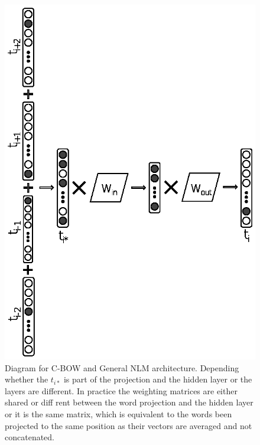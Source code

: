 \begin{figure}[t]
	\begin{center}
    	\includegraphics[scale=0.99]{Figures/CBOW_diagram.eps}
		\caption{Diagram for C-BOW and General NLM architecture. Depending whether the $t_{i*}$ is part of the projection and the hidden layer or the layers are different. In practice the weighting matrices are either shared or diff rent between the word projection and the hidden layer or it is the same matrix, which is equivalent to the words been projected to the same position as their vectors are averaged and not concatenated.}
		\label{chap:word_embeddingss:fig:CBOW_diagram}
	\end{center}
\end{figure}


